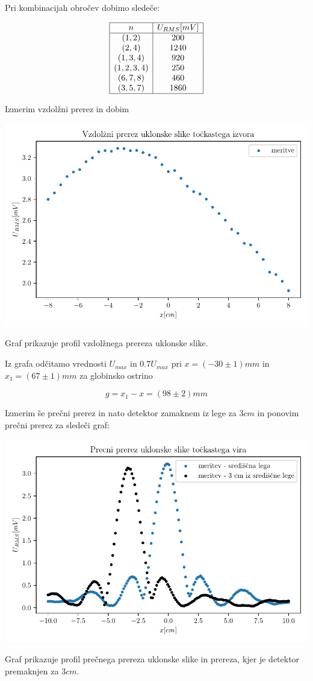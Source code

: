 \documentclass[12pt]{report}
\begin{document}
Pri kombinacijah obročev dobimo sledeče: 

\begin{tabela}[H]
  \centering
  \[
    \begin{array}{|c|c|} \hline
      n & U_{RMS}[mV]\\ \hline
      (1,2) & 200 \\
      (2, 4) & 1240 \\ 
      (1, 3, 4) & 920 \\
      (1, 2, 3, 4) & 250 \\
      (6, 7, 8) & 460 \\
      (3, 5, 7) & 1860 \\ \hline
\end{array}
\]
\end{tabela}

Izmerim vzdolžni prerez in dobim

\begin{slika}
  \centering
  \includegraphics{vzdolz}
  \caption{\small Graf prikazuje profil vzdolžnega prereza uklonske slike. }
\end{slika}

Iz grafa odčitamo vrednosti $U_{max}$ in $0.7U_{max}$ pri $x = (-30 \pm 1)mm$ in $x_1 = (67 \pm 1)mm$ za globinsko ostrino

\[
g = x_1 - x = (98 \pm 2)mm  
\]

Izmerim še prečni prerez in nato detektor zamaknem iz lege za $3cm$ in ponovim prečni prerez za sledeči graf: 

\begin{slika}
  \centering
  \includegraphics{precno}
  \caption{\small Graf prikazuje profil prečnega prereza uklonske slike in prereza, kjer je detektor premaknjen za $3cm$. }
\end{slika}
\end{document}
